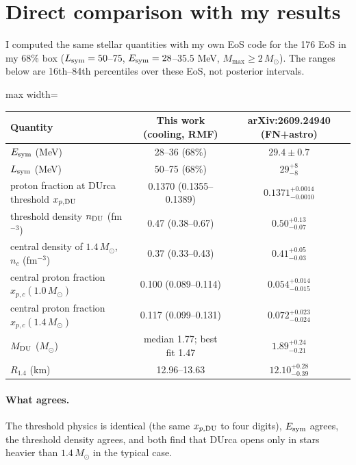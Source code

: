 \documentclass[11pt,a4paper]{article}
\newcommand{\Esym}{E_{\rm sym}}
\newcommand{\Lsym}{L_{\rm sym}}
\newcommand{\Msun}{M_\odot}
\begin{document}
\section{Direct comparison with my results}\label{sec:cmp}
I computed the same stellar quantities with my own EoS code for the 176 EoS in my 68\% box ($\Lsym=50$--75, $\Esym=28$--35.5 MeV, $M_{\max}\ge2\,\Msun$). The ranges below are 16th--84th percentiles over these EoS, not posterior intervals.

\begin{table}[h]
\centering
\begin{adjustbox}{max width=\linewidth}
\begin{tabular}{lcc}
\toprule
Quantity & This work (cooling, RMF) & arXiv:2609.24940 (FN+astro)\\
\midrule
$\Esym$ (MeV) & 28--36 (68\%) & $29.4\pm0.7$\\
$\Lsym$ (MeV) & 50--75 (68\%) & $29^{+8}_{-8}$\\
proton fraction at DUrca threshold $x_{p,\rm DU}$ & 0.1370 (0.1355--0.1389) & $0.1371^{+0.0014}_{-0.0010}$\\
threshold density $n_{\rm DU}$ (fm$^{-3}$) & 0.47 (0.38--0.67) & $0.50^{+0.13}_{-0.07}$\\
central density of $1.4\,\Msun$, $n_c$ (fm$^{-3}$) & 0.37 (0.33--0.43) & $0.41^{+0.05}_{-0.03}$\\
central proton fraction $x_{p,c}(1.0\,\Msun)$ & 0.100 (0.089--0.114) & $0.054^{+0.014}_{-0.015}$\\
central proton fraction $x_{p,c}(1.4\,\Msun)$ & 0.117 (0.099--0.131) & $0.072^{+0.023}_{-0.024}$\\
$M_{\rm DU}$ ($\Msun$) & median 1.77; best fit 1.47 & $1.89^{+0.24}_{-0.21}$\\
$R_{1.4}$ (km) & 12.96--13.63 & $12.10^{+0.28}_{-0.39}$\\
\bottomrule
\end{tabular}
\end{adjustbox}
\end{table}

\paragraph{What agrees.} The threshold physics is identical (the same $x_{p,\rm DU}$ to four digits), $\Esym$ agrees, the threshold density agrees, and both find that DUrca opens only in stars heavier than $1.4\,\Msun$ in the typical case.
\end{document}
